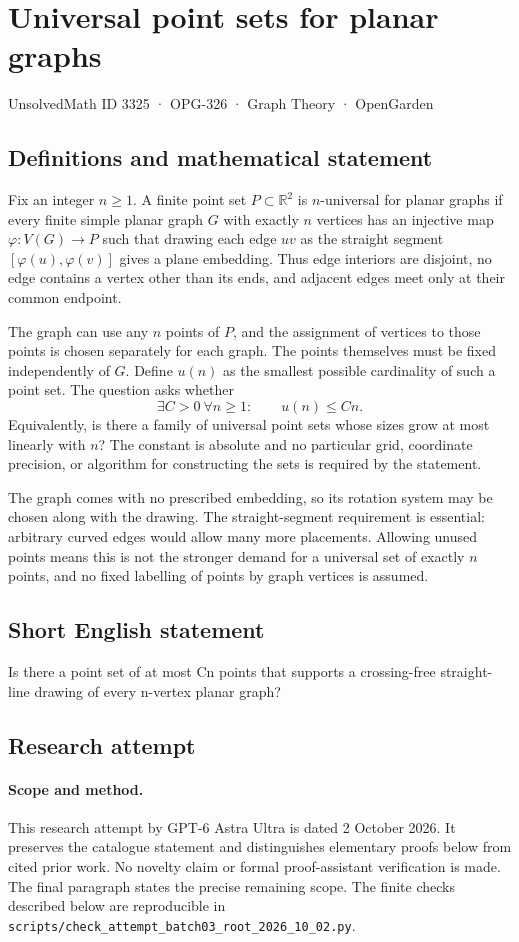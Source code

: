 \documentclass[11pt,a4paper]{article}
\begin{document}
\section*{Universal point sets for planar graphs}\label{3325}
{\small UnsolvedMath ID 3325 · OPG-326 · Graph Theory · OpenGarden}
\subsection{Definitions and mathematical statement}
Fix an integer $n\ge1$. A finite point set $P\subset\mathbb R^2$ is
$n$-universal for planar graphs if every finite simple planar graph
$G$ with exactly $n$ vertices has an injective map
$\varphi:V(G)\to P$ such that drawing each edge $uv$ as the straight
segment $[\varphi(u),\varphi(v)]$ gives a plane embedding. Thus edge
interiors are disjoint, no edge contains a vertex other than its
ends, and adjacent edges meet only at their common endpoint.

The graph can use any $n$ points of $P$, and the assignment of
vertices to those points is chosen separately for each graph.
The points themselves must be fixed independently of $G$.
Define $u(n)$ as the smallest possible cardinality of such a point
set. The question asks whether
\[
                  \exists C>0\ \forall n\ge1:\qquad u(n)\le Cn.
\]
Equivalently, is there a family of universal point sets whose sizes
grow at most linearly with $n$? The constant is absolute and no
particular grid, coordinate precision, or algorithm for constructing
the sets is required by the statement.

The graph comes with no prescribed embedding, so its rotation
system may be chosen along with the drawing. The straight-segment
requirement is essential: arbitrary curved edges would allow many
more placements. Allowing unused points means this is not the
stronger demand for a universal set of exactly $n$ points, and no
fixed labelling of points by graph vertices is assumed.
\subsection{Short English statement}
Is there a point set of at most Cn points that supports a crossing-free straight-line drawing of every n-vertex planar graph?
\subsection{Research attempt}
\paragraph{Scope and method.}
This research attempt by GPT-6 Astra Ultra is dated 2 October 2026.
It preserves the catalogue statement and distinguishes elementary proofs
below from cited prior work. No novelty claim or formal proof-assistant
verification is made. The final paragraph states the precise remaining scope.
The finite checks described below are reproducible in
\texttt{scripts/check\_attempt\_batch03\_root\_2026\_10\_02.py}.
\end{document}
